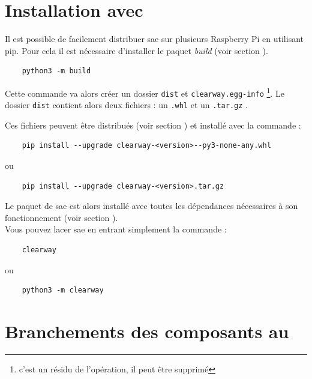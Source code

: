 \section{Installation avec }

Il est possible de facilement distribuer \gls{sae} sur plusieurs Raspberry Pi en utilisant \gls{pip}. Pour
cela il est nécessaire d'installer le \gls{paquet} \textit{build} (voir section ).

\begin{verbatim}
    python3 -m build
\end{verbatim}

Cette commande va alors créer un dossier \texttt{dist} et \texttt{clearway.egg-info}
\footnote{c'est un résidu de l'opération, il  peut être supprimé}. Le dossier \texttt{dist} contient
alors deux fichiers : un \texttt{.whl} et un \texttt{.tar.gz} \nocite{wheel}\nocite{setuptools}.\newline

Ces fichiers peuvent être distribués (voir section ) et installé avec la commande :

\begin{verbatim}
    pip install --upgrade clearway-<version>--py3-none-any.whl
\end{verbatim}

ou

\begin{verbatim}
    pip install --upgrade clearway-<version>.tar.gz
\end{verbatim}

Le \gls{paquet} de \gls{sae} est alors installé avec toutes les dépendances nécessaires à son fonctionnement (voir
section ).\\
Vous pouvez lacer \gls{sae} en entrant simplement la commande :

\begin{verbatim}
    clearway
\end{verbatim}

ou

\begin{verbatim}
    python3 -m clearway
\end{verbatim}

\section{Branchements des composants au }

